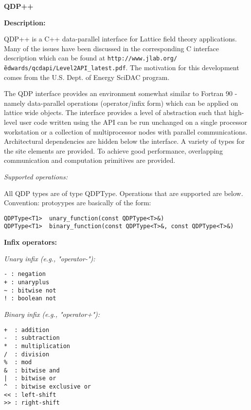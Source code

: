 \documentclass[12pt,letterpaper]{article}
\begin{document}
\pagestyle{empty} 
\begin{center}
{\bfseries\large QDP++}
\end{center}
\bigskip

\date{Sept. 25, 2002}

\noindent
{\bf\large Description:}

QDP++ is a C++ data-parallel interface for Lattice field theory
applications. Many of the issues have been discussed in the
corresponding C interface description which can be found at
{\tt http://www.jlab.org/\~edwards/qcdapi/Level2API\_latest.pdf}. The
motivation for this development comes from the U.S. Dept. of Energy
SciDAC program.

The QDP interface provides an environment somewhat similar to 
Fortran 90 - namely data-parallel operations (operator/infix form)
which can be applied on lattice wide objects. The interface provides a
level of abstraction such that high-level user code written using the
API can be run unchanged on a single processor workstation or a
collection of multiprocessor nodes with parallel communications.
Architectural dependencies are hidden below the interface. A variety
of types for the site elements are provided. To achieve good
performance, overlapping communication and computation primitives are
provided.

\medskip

\noindent
{\em Supported operations:}

All QDP types are of type QDPType. Operations that are supported are below.
Convention: protoyypes are basically of the form:

\begin{verbatim}
QDPType<T1>  unary_function(const QDPType<T>&)
QDPType<T1>  binary_function(const QDPType<T>&, const QDPType<T>&)
\end{verbatim}

\medskip


\noindent
{\bf\large Infix operators:}

\noindent
{\em Unary infix (e.g., "operator-"):}

\begin{verbatim}
- : negation
+ : unaryplus
~ : bitwise not
! : boolean not
\end{verbatim}

\noindent
{\em Binary infix (e.g., "operator+"):}

\begin{verbatim}
+  : addition
-  : subtraction
*  : multiplication
/  : division
%  : mod
&  : bitwise and
|  : bitwise or
^  : bitwise exclusive or
<< : left-shift
>> : right-shift
\end{verbatim}
\end{document}
